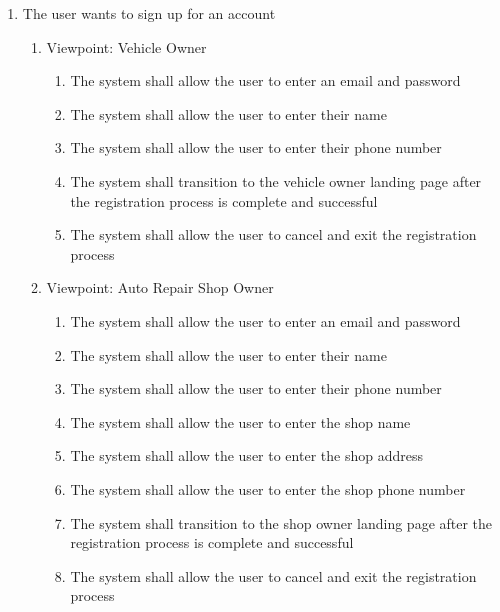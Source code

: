 \documentclass[12pt]{article}
\begin{document}
\begin{enumerate}[label=BE\arabic*., series=business_events]
	\item The user wants to sign up for an account
	      \begin{enumerate}[VP\arabic*.]
		      \item Viewpoint: Vehicle Owner
		            \begin{enumerate}
			            \item The system shall allow the user to enter an email and password
			            \item The system shall allow the user to enter their name
			            \item The system shall allow the user to enter their phone number
			            \item The system shall transition to the vehicle owner landing page after the registration process is
			                  complete and successful
			            \item The system shall allow the user to cancel and exit the registration process
		            \end{enumerate}

		      \item Viewpoint: Auto Repair Shop Owner
		            \begin{enumerate}
			            \item The system shall allow the user to enter an email and password
			            \item The system shall allow the user to enter their name
			            \item The system shall allow the user to enter their phone number
			            \item The system shall allow the user to enter the shop name
			            \item The system shall allow the user to enter the shop address
			            \item The system shall allow the user to enter the shop phone number
			            \item The system shall transition to the shop owner landing page after the registration process is
			                  complete and successful
			            \item The system shall allow the user to cancel and exit the registration process
		            \end{enumerate}


\end{enumerate}
\end{enumerate}
\end{document}

